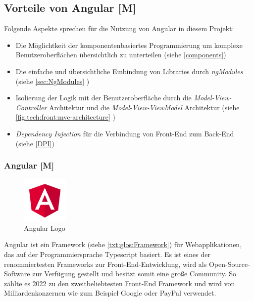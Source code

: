 \subsection{Vorteile von Angular [M]}
Folgende Aspekte sprechen für die Nutzung von Angular in diesem Projekt:

\begin{itemize}
  \item Die Möglichtkeit der komponentenbasiertes Programmierung um komplexe Benutzeroberflächen übersichtlich zu unterteilen (siehe \ref{components}) 
  \item Die einfache und übersichtliche Einbindung von Libraries durch \emph{ngModules} (siehe \ref{sec:NgModules} )
  \item Isolierung der Logik mit der Benutzeroberfläche durch die \emph{Model-View-Controller} Architektur und die \emph{Model-View-ViewModel} Architektur (siehe \ref{fig:tech:front:mvc-architecture} )
  \item 
  \emph{Dependency Injection} für die Verbindung von Front-End zum Back-End (siehe \ref{DPI})
\end{itemize}

\subsubsection{Angular [M]}
\begin{figure}
  \begin{center}
    \includegraphics[width=0.2\textwidth]{pics/AngularLogo.png}
   \caption{Angular Logo}
  \end{center}
\end{figure}
Angular ist ein Framework (siehe \ref{txt:glos:Framework}) für Webapplikationen, das auf der Programmiersprache Typescript basiert. Es ist eines der renommiertesten Frameworks zur Front-End-Entwicklung, wird als Open-Source-Software zur Verfügung gestellt und besitzt somit eine große Community. So zählte es 2022 zu den zweitbeliebtesten Front-End Framework \cite{AngularEvidence} und wird von Milliardenkonzernen wie zum Beispiel Google oder PayPal verwendet. 
\cite{AngularEvidence2}

